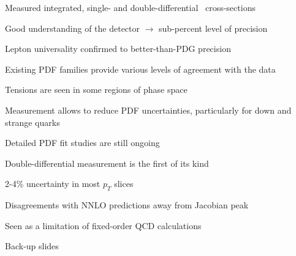 {
\iteb
\item Measured integrated, single- and double-differential \Wmn\ cross-sections
\item Good understanding of the detector $\rightarrow$ sub-percent level of precision
\item Lepton universality confirmed to better-than-PDG precision
\item Existing PDF families provide various levels of agreement with the data
\iteb
\item Tensions are seen in some regions of phase space
\itee
\item Measurement allows to reduce PDF uncertainties, particularly for down and strange quarks
\iteb
\item Detailed PDF fit studies are still ongoing
\itee
\item Double-differential measurement is the first of its kind
\iteb
\item 2-4\% uncertainty in most $p_T$ slices
\item Disagreements with NNLO predictions away from Jacobian peak
\item Seen as a limitation of fixed-order QCD calculations
\itee
\itee
}

\appendix
{}
\setcounter{finalframe}{\value{framenumber}}

\slide{}
{
\centering
\Huge Back-up slides
}


{
 \begin{columns}
\end{columns}
}


